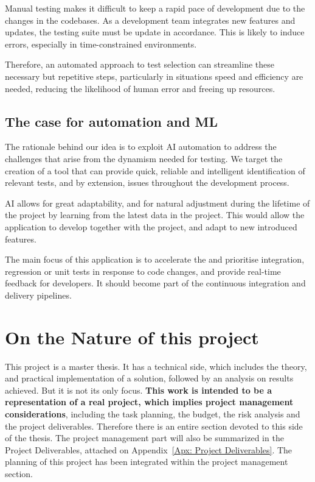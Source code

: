 \documentclass[a4paper, 11pt]{report}
\begin{document}
Manual testing makes it difficult to keep a rapid pace of development due to the changes in the codebases. As a development team integrates new features and updates, the testing suite must be update in accordance. This is likely to induce errors, especially in time-constrained environments.

Therefore, an automated approach to test selection can streamline these necessary but repetitive steps, particularly in situations speed and efficiency are needed, reducing the likelihood of human error and freeing up resources.

\subsection{The case for automation and ML}
The rationale behind our idea is to exploit AI automation to address the challenges that arise from the dynamism needed for testing. We target the creation of a tool that can provide quick, reliable and intelligent identification of relevant tests, and by extension, issues throughout the development process.

AI allows for great adaptability, and for natural adjustment during the lifetime of the project by learning from the latest data in the project. This would allow the application to develop together with the project, and adapt to new introduced features.

The main focus of this application is to accelerate the and prioritise integration, regression or unit tests in response to code changes, and provide real-time feedback for developers. It should become part of the continuous integration and delivery pipelines.

\section{On the Nature of this project}
This project is a master thesis. It has a technical side, which includes the theory, and practical implementation of a solution, followed by an analysis on results achieved. But it is not its only focus. \textbf{This work is intended to be a representation of a real project, which implies project management considerations}, including the task planning, the budget, the risk analysis and the project deliverables. Therefore there is an entire section devoted to this side of the thesis. The project management part will also be summarized in the Project Deliverables, attached on Appendix~\ref{Apx: Project Deliverables}. The planning of this project has been integrated within the project management section.
\end{document}
